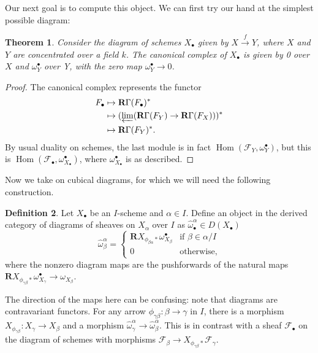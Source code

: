 \documentclass[proquest]{uwthesis}[2014/11/13]
\newtheorem{theorem}{Theorem}[section]
\theoremstyle{definition}
\newtheorem{definition}[theorem]{Definition}
\DeclareMathOperator{\Hom}{Hom}
\newcommand{\FF}{\mathscr{F}}
\newcommand{\bR}{\textbf{R}}
\begin{document}
Our next goal is to compute this object.
We can first try our hand at the simplest possible diagram:
\begin{theorem}
	Consider the diagram of schemes $X_\bullet$ given by $X \xrightarrow{f} Y$, where $X$ and $Y$ are concentrated over a field $k$.
	The canonical complex of $X_\bullet$ is given by 0 over $X$ and $\omega^\bullet_Y$ over Y, with the zero map $\omega^\bullet_Y \rightarrow 0$.
\end{theorem}
\begin{proof}
	The canonical complex represents the functor
	\begin{align*}
	F_\bullet &\mapsto \bR \Gamma (F_\bullet)^* \\
	&\mapsto (\varprojlim (\bR \Gamma (F_Y) \rightarrow \bR \Gamma (F_X)))^* \\
	&\mapsto \bR \Gamma (F_Y)^*.
	\end{align*}
	By usual duality on schemes, the last module is in fact $\Hom(\FF_Y, \omega_Y^\bullet)$, but this is $\Hom(\FF_\bullet, \omega^\bullet_{X_\bullet})$, where $\omega^\bullet_{X_\bullet}$ is as described.
\end{proof}

Now we take on cubical diagrams, for which we will need the following construction.
\begin{definition}
	Let $X_\bullet$ be an $I$-scheme and $\alpha \in I$.
	Define an object in the derived category of diagrams of sheaves on $X_\alpha$ over $I$ as $\hat{\omega}_\bullet^\alpha \in D(X_\bullet)$
	\[
		\hat{\omega}^\alpha_\beta =  \begin{cases}
											\bR X_{\phi_{\beta \alpha} *} \omega_{X_\beta}^\bullet & \text{if } \beta \in \alpha / I \\
											0 & \text{otherwise,}
									\end{cases}
	\]
	where the nonzero diagram maps are the pushforwards of the natural maps ${\bR X_{\phi_{\gamma \beta} *} \omega_{X_\gamma}^\bullet \rightarrow \omega_{X_\beta}}$.

	The direction of the maps here can be confusing: note that diagrams are contravariant functors.
	For any arrow $\phi_{\gamma \beta} : \beta \rightarrow \gamma$ in $I$, there is a morphism $X_{\phi_{\gamma \beta}} : X_\gamma \rightarrow X_\beta$ and a morphism $\hat{\omega}^\alpha_\gamma \rightarrow \hat{\omega}^\alpha_\beta$.
	This is in contrast with a sheaf $\FF_\bullet$ on the diagram of schemes with morphisms $\FF_\beta \rightarrow X_{\phi_{\gamma \beta} *} \FF_\gamma$.
\end{definition}
\end{document}
